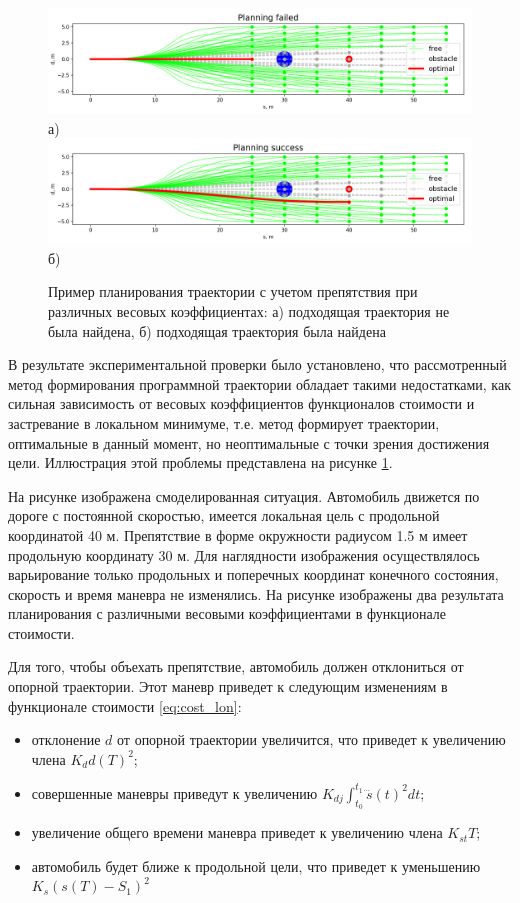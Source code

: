 \begin{figure}[h]
    \centering
    \includegraphics[width=\linewidth]{images/quintic_planning_failed} \\ а)
    \includegraphics[width=\linewidth]{images/quintic_planning_success} \\ б)
    \caption{Пример планирования траектории с учетом препятствия при различных весовых коэффициентах:
    а) подходящая траектория не была найдена, б) подходящая траектория была найдена}
    \label{img:quintic_planning_failed}
\end{figure}

В результате экспериментальной проверки было установлено, что рассмотренный метод формирования программной траектории
обладает такими недостатками, как сильная зависимость от весовых коэффициентов функционалов стоимости и застревание
в локальном минимуме, т.е. метод формирует траектории, оптимальные в данный момент, но неоптимальные с точки зрения
достижения цели. Иллюстрация этой проблемы представлена на рисунке \ref{img:quintic_planning_failed}.

На рисунке изображена смоделированная ситуация. Автомобиль движется по дороге с постоянной скоростью, имеется локальная
цель с продольной координатой 40 м. Препятствие в форме окружности радиусом 1.5 м имеет продольную координату 30 м.
Для наглядности изображения осуществлялось варьирование только продольных и поперечных координат конечного состояния,
скорость и время маневра не изменялись. На рисунке изображены два результата планирования с различными весовыми
коэффициентами в функционале стоимости.

Для того, чтобы объехать препятствие, автомобиль должен отклониться от опорной траектории. Этот маневр приведет
к следующим изменениям в функционале стоимости \ref{eq:cost_lon}:
\begin{itemize}
      \item отклонение $d$ от опорной траектории увеличится, что приведет к увеличению члена $K_dd(T)^2$;
      \item совершенные маневры приведут к увеличению $K_{dj}\int_{t_0}^{t_1}{\dddot{s}(t)^2dt}$;
      \item увеличение общего времени маневра приведет к увеличению члена $K_{st}T$;
      \item автомобиль будет ближе к продольной цели, что приведет к уменьшению $K_s(s(T)-S_1)^2$
\end{itemize}

